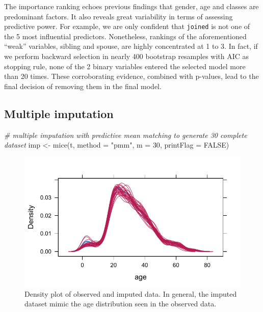 \documentclass[]{interact}
\theoremstyle{plain}%
\theoremstyle{definition}
\theoremstyle{remark}
\newenvironment{Shaded}{\begin{snugshade}}{\end{snugshade}}
\newcommand{\AttributeTok}[1]{\textcolor[rgb]{0.77,0.63,0.00}{#1}}
\newcommand{\CommentTok}[1]{\textcolor[rgb]{0.56,0.35,0.01}{\textit{#1}}}
\newcommand{\ConstantTok}[1]{\textcolor[rgb]{0.00,0.00,0.00}{#1}}
\newcommand{\DecValTok}[1]{\textcolor[rgb]{0.00,0.00,0.81}{#1}}
\newcommand{\FunctionTok}[1]{\textcolor[rgb]{0.00,0.00,0.00}{#1}}
\newcommand{\NormalTok}[1]{#1}
\newcommand{\OtherTok}[1]{\textcolor[rgb]{0.56,0.35,0.01}{#1}}
\newcommand{\SpecialCharTok}[1]{\textcolor[rgb]{0.00,0.00,0.00}{#1}}
\newcommand{\StringTok}[1]{\textcolor[rgb]{0.31,0.60,0.02}{#1}}
\begin{document}
The importance ranking echoes previous findings that gender, age and classes are predominant factors. It also reveals great variability in terms of assessing predictive power. For example, we are only confident that \texttt{joined} is not one of the 5 most influential predictors. Nonetheless, rankings of the aforementioned ``weak'' variables, sibling and spouse, are highly concentrated at 1 to 3. In fact, if we perform backward selection in nearly 400 bootstrap resamples with AIC as stopping rule, none of the 2 binary variables entered the selected model more than 20 times. These corroborating evidence, combined with p-values, lead to the final decision of removing them in the final model.

\begin{Shaded}
\end{Shaded}

\hypertarget{imputation}{%
\subsection{Multiple imputation}\label{imputation}}

\begin{Shaded}
\begin{Highlighting}[]
\CommentTok{\# multiple imputation with predictive mean matching to generate 30 complete dataset}
\NormalTok{imp }\OtherTok{\textless{}{-}} \FunctionTok{mice}\NormalTok{(t, }\AttributeTok{method =} \StringTok{"pmm"}\NormalTok{, }\AttributeTok{m =} \DecValTok{30}\NormalTok{, }\AttributeTok{printFlag =} \ConstantTok{FALSE}\NormalTok{)}
\end{Highlighting}
\end{Shaded}

\begin{figure}

{\centering \includegraphics{titanic-survival_files/figure-latex/unnamed-chunk-13-1} 

}

\caption{Density plot of observed and imputed data. In general, the imputed dataset mimic the age distribution seen in the observed data.}\label{fig:unnamed-chunk-13}
\end{figure}
\end{document}
